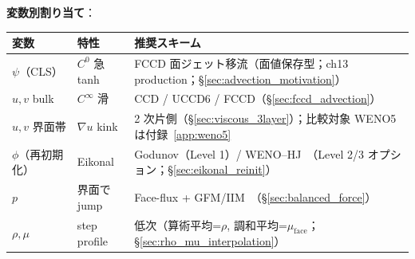 \noindent\textbf{変数別割り当て}：
\begin{center}
\begin{tabular}{@{}lll@{}}
\hline
変数 & 特性 & 推奨スキーム \\
\hline
$\psi$（CLS）& $C^0$ 急 tanh & FCCD 面ジェット移流（面値保存型；ch13 production；\S\ref{sec:advection_motivation}） \\
$u, v$ bulk & $C^\infty$ 滑 & CCD / UCCD6 / FCCD（\S\ref{sec:fccd_advection}） \\
$u, v$ 界面帯 & $\nabla u$ kink & 2 次片側（\S\ref{sec:viscous_3layer}）；比較対象 WENO5 は付録~\ref{app:weno5} \\
$\phi$（再初期化）& Eikonal & Godunov（Level 1）/ WENO--HJ~\cite{JiangPeng2000}（Level 2/3 オプション；\S\ref{sec:eikonal_reinit}） \\
$p$ & 界面で jump & Face-flux + GFM/IIM~\cite{Fedkiw1999}（\S\ref{sec:balanced_force}）\\
$\rho, \mu$ & step profile & 低次（算術平均=$\rho$, 調和平均=$\mu_\text{face}$；\S\ref{sec:rho_mu_interpolation}）\\
\hline
\end{tabular}
\end{center}

